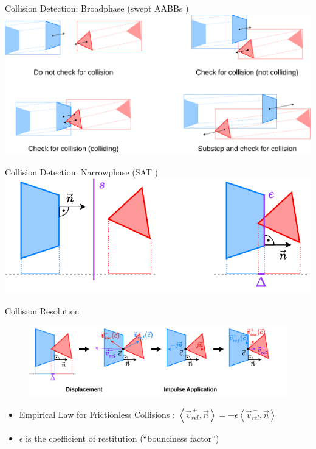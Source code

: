 \begin{frame}{Collision Detection: Broadphase (swept AABBs \cite{sweptAABB})}
  \includegraphics[width = \textwidth]{../figures/physics/aabb_extended.pdf}
\end{frame}

\begin{frame}{Collision Detection: Narrowphase (SAT \cite{geometrySAT})}
    \centering
    \includegraphics[width = \textwidth]{../figures/physics/sat2.pdf}
\end{frame}

\begin{frame}{Collision Resolution}
    \begin{figure}
        \includegraphics[width = \textwidth]{../figures/physics/resolution2.pdf}
    \end{figure}
    \begin{itemize}
        \item Empirical Law for Frictionless Collisions \cite{baraff}: $\left<\overrightarrow{v}_{rel}^{\,+}, \overrightarrow{n}\right> = -\epsilon\left<\overrightarrow{v}_{rel}^{\,-}, \overrightarrow{n}\right>$
        \item $\epsilon$ is the coefficient of restitution (``bounciness factor'')
    \end{itemize}
\end{frame}

